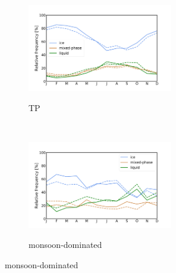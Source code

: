 \documentclass[alpha-refs]{wiley-article}
\begin{document}
\begin{figure}[!htbp]
\centering
    \begin{subfigure}[b]{0.5\textwidth}
       \centering
        \caption{TP}       
        \includegraphics[height=1.5in]{monthly_cldphase_TP.png}
          \label{fig:monthly_cldphase1}
    \end{subfigure}%
    ~ 
    \begin{subfigure}[b]{0.5\textwidth}
        \centering
        \caption{monsoon-dominated} 
        \includegraphics[height=1.5in]{monthly_cldphase_monsoonmode.png}
  \label{fig:monthly_cldphase2}
    \end{subfigure}
    
    \bigskip


\end{figure}
\end{document}

